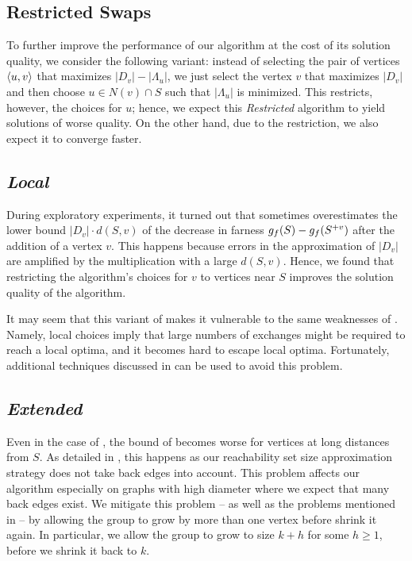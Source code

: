 \subsection{Restricted Swaps}
\label{sec:lsh-gc-ls-restrict}
%
To further improve the performance of our
\localswaps algorithm at the cost of its solution quality, we consider the
following variant: instead of selecting the pair of vertices $\pair{u}{v}$ that
maximizes $|D_v| - |\Lambda_u|$, we just select the vertex $v$ that maximizes
$|D_v|$ and then choose $u \in N(v) \cap S$ such that $|\Lambda_u|$ is
minimized. This restricts, however, the choices for $u$; hence, we expect this
\emph{Restricted} \localswaps algorithm to yield solutions of worse quality.
On the other hand, due to the restriction, we also expect it to converge faster.

\subsection{\emph{Local} \growshrink}
\label{sec:lsh-gc-local-gs}
%
During exploratory experiments, it turned out that \growshrink sometimes
overestimates the lower bound $|D_v|\cdot d(S, v)$ of the decrease in
farness $g_f(S) - g_f(S^{+v})$ after the addition of a vertex $v$.
%
This happens because errors in the approximation of $|D_v|$ are amplified
by the multiplication with a large $d(S, v)$. Hence, we found that restricting
the algorithm's choices for $v$ to vertices near $S$ improves the solution
quality of the algorithm.

It may seem that this variant of \growshrink makes it vulnerable to the same
weaknesses of \localswaps. Namely, local choices imply that large numbers of
exchanges might be required to reach a local optima, and it becomes hard to
escape local optima. Fortunately, additional techniques discussed in
 can be used to avoid this problem.

\subsection{\emph{Extended} \growshrink}
\label{sec:lsh-gc-extended-gs}
%
Even in the case of \growshrink, the bound of 
becomes worse for vertices at long distances from $S$. As detailed in
, this happens as our reachability
set size approximation strategy does not take back edges into account.
This problem affects our algorithm especially on graphs with high diameter
where we expect that many back edges exist. We mitigate this problem -- as well
as the problems mentioned in  -- by allowing the group
to grow by more than one vertex before shrink it again.
In particular, we allow the group to grow to size $k + h$ for some $h \ge 1$,
before we shrink it back to $k$.

